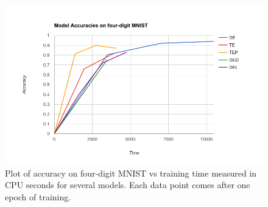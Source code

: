 
\begin{figure}
    \centering
    \includegraphics[scale=0.45]{resources/mnist_4_graph.png}
    \caption{Plot of accuracy on four-digit MNIST vs training time measured in CPU seconds for several models. Each data point comes after one epoch of training.}
    \label{fig:mnist_early_models}
\end{figure}
